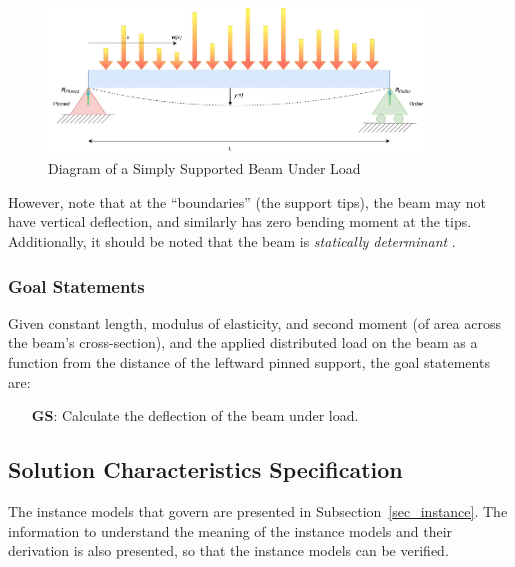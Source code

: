 \documentclass[12pt]{article}
\newcounter{goalnum} %
\begin{document}
\begin{figure}[H]
    \begin{center}
        \includegraphics[width=0.9\textwidth]{temp/beam_bending_diagram_annotated.drawio.png}
        \caption{\label{beam_bending_diagram_annotated} Diagram of a Simply Supported Beam Under Load}
    \end{center}
\end{figure}

\noindent{}However, note that at the ``boundaries'' (the support tips), the beam
may not have vertical deflection, and similarly has zero bending moment at the
tips. Additionally, it should be noted that the beam is \textit{statically
    determinant} \cite{StaticallyDeterminantWiki}.

\subsubsection{Goal Statements}
\label{sssec_goals}

\noindent{}Given constant length, modulus of elasticity, and second moment (of
area across the beam's cross-section), and the applied distributed load on the
beam as a function from the distance of the leftward pinned support, the goal
statements are:

\begin{itemize}

    \item[\refstepcounter{goalnum}\textbf{GS\thegoalnum{}}\label{deflection}:]
        Calculate the deflection of the beam under load.

\end{itemize}

\subsection{Solution Characteristics Specification}

The instance models that govern \progname{} are presented in
Subsection~\ref{sec_instance}.  The information to understand the meaning of the
instance models and their derivation is also presented, so that the instance
models can be verified.
\end{document}
